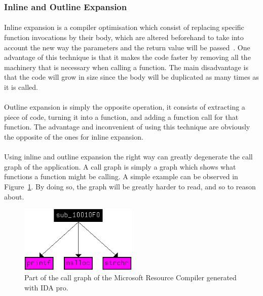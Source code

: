 \subsubsection{Inline and Outline Expansion}
\paragraph{}
Inline expansion is a compiler optimisation which consist of replacing specific function invocations by their body, which are altered beforehand to take into account the new way the parameters and the return value will be passed~\cite{aho1986compilers}. One advantage of this technique is that it makes the code faster by removing all the machinery that is necessary when calling a function. The main disadvantage is that the code will grow in size since the body will be duplicated as many times as it is called.

\paragraph{}
Outline expansion is simply the opposite operation, it consists of extracting a piece of code, turning it into a function, and adding a function call for that function. The advantage and inconvenient of using this technique are obviously the opposite of the ones for inline expansion.

\paragraph{}
Using inline and outline expansion the right way can greatly degenerate the call graph of the application. A call graph is simply a graph which shows what functions a function might be calling. A simple example can be observed in Figure~\ref{fig:call_graph}. By doing so, the graph will be greatly harder to read, and so to reason about.

\begin{figure}[!htb]
	\centering
	\includegraphics[width=0.5\textwidth]{reverse_engineering/call_graph.png}
	\caption{Part of the call graph of the Microsoft Resource Compiler generated with IDA pro.}
	\label{fig:call_graph}
\end{figure}


